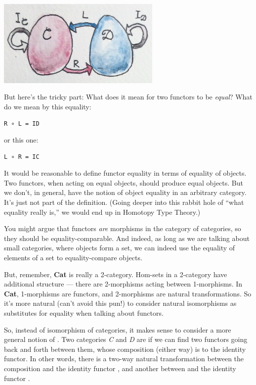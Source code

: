 \includegraphics[width=3.12500in]{images/adj-1.jpg}

But here's the tricky part: What does it mean for two functors to be
\emph{equal}? What do we mean by this equality:

\begin{verbatim}
R ∘ L = ID
\end{verbatim}

or this one:

\begin{verbatim}
L ∘ R = IC
\end{verbatim}

It would be reasonable to define functor equality in terms of equality
of objects. Two functors, when acting on equal objects, should produce
equal objects. But we don't, in general, have the notion of object
equality in an arbitrary category. It's just not part of the definition.
(Going deeper into this rabbit hole of ``what equality really is,'' we
would end up in Homotopy Type Theory.)

You might argue that functors \emph{are} morphisms in the category of
categories, so they should be equality-comparable. And indeed, as long
as we are talking about small categories, where objects form a set, we
can indeed use the equality of elements of a set to equality-compare
objects.

But, remember, \textbf{Cat} is really a 2-category. Hom-sets in a
2-category have additional structure --- there are 2-morphisms acting
between 1-morphisms. In \textbf{Cat}, 1-morphisms are functors, and
2-morphisms are natural transformations. So it's more natural (can't
avoid this pun!) to consider natural isomorphisms as substitutes for
equality when talking about functors.

So, instead of isomorphism of categories, it makes sense to consider a
more general notion of . Two categories \emph{C} and
\emph{D} are  if we can find two functors going back
and forth between them, whose composition (either way) is
 to the identity functor. In other words,
there is a two-way natural transformation between the composition
 and the identity functor , and another
between  and the identity functor .


